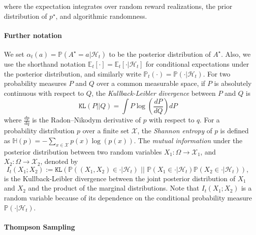 \documentclass[10pt]{article}
\def\hist{\mathcal{H}_{t}}
\def\KL{\texttt{KL}}
\def\E{\mathbb{E}}
\newcommand{\Prob}{\mathbb{P}}
\newcommand{\bH}{{\mathbb{H}}}
\begin{document}
where the expectation integrates over  random reward realizations, the prior distribution of $p^\star$, and algorithmic randomness. 


\paragraph{Further notation} We set $\alpha_t(a) = \Prob\left( A^\star=a \vert \hist  \right)$ to be the posterior distribution of $A^\star$. Also, we use the shorthand notation $\E_{t}[\cdot]=\E_{t}[\cdot | \hist]$ for conditional expectations under the posterior distribution, and similarly write $\Prob_{t}(\cdot)=\Prob(\cdot | \hist)$. 
For two probability measures $P$ and $Q$ over a common measurable space, if $P$ is absolutely continuous with respect to $Q$, the \textit{Kullback-Leibler divergence} between $P$ and $Q$ is
\begin{equation}
\KL(P || Q)= \int P \log \left( \frac{dP}{dQ} \right)dP
\end{equation}
where $\frac{dp}{dq}$ is the Radon--Nikodym derivative of $p$ with respect to $q$. For a probability distribution $p$ over a finite set $\mathcal{X}$, the {\it Shannon entropy} of $p$ is defined as $\bH(p) =- \sum_{x\in\mathcal{X}} p(x) \log\left( p(x) \right)$.
The {\it mutual information} under the posterior distribution between two random variables $X_1:\Omega \rightarrow \mathcal{X}_{1}$, and $X_2:\Omega \rightarrow \mathcal{X}_{2}$, denoted by
\begin{equation}
I_{t}(X_1 ; X_2) := \KL\left( \mathbb{P}\left( (X_{1}, X_{2})  \in \cdot \vert \hist \right) \,\, || \,\, \mathbb{P}\left( X_{1}  \in \cdot \vert \hist \right) \mathbb{P}\left( X_{2}  \in \cdot \vert \hist \right)  \right),
\end{equation}
is the Kullback-Leibler divergence between the joint posterior distribution of $X_{1}$ and $X_{2}$ and the product of the marginal distributions. Note that $I_{t}(X_1 ; X_2)$ is a random variable because of its dependence on the conditional probability measure $\Prob\left( \cdot \vert \hist \right)$.




\paragraph{Thompson Sampling}
\end{document}
